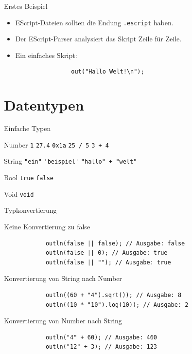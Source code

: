 \documentclass[ucs,9pt]{beamer}
\begin{document}
\begin{frame}[fragile]{Erstes Beispiel}
\begin{itemize}
	\addtolength{\itemsep}{\baselineskip}
	\item EScript-Dateien sollten die Endung \texttt{.escript} haben.
	\item Der EScript-Parser analysiert das Skript Zeile für Zeile.
	\item Ein einfaches Skript:
			\begin{lstlisting}
				out("Hallo Welt!\n");
			\end{lstlisting}
\end{itemize}
\end{frame}

\section{Datentypen}
\begin{frame}[fragile]{Einfache Typen}
	\begin{block}{Number}
		\hfill \lstinline!1! \hfill \lstinline!27.4! \hfill \lstinline!0x1a! \hfill \lstinline!25 / 5! \hfill \lstinline!3 + 4! \hfill{}
	\end{block}
	\begin{block}{String}
		\hfill \lstinline!"ein"! \hfill \lstinline!'beispiel'! \hfill \lstinline!"hallo" + "welt"! \hfill{}
	\end{block}
	\begin{block}{Bool}
		\hfill \lstinline!true! \hfill \lstinline!false! \hfill{}
	\end{block}
	\begin{block}{Void}
		\hfill \lstinline!void! \hfill{}
	\end{block}
\end{frame}

\begin{frame}[fragile]{Typkonvertierung}
	\begin{block}{Keine Konvertierung zu false}
		\begin{lstlisting}
			outln(false || false); // Ausgabe: false
			outln(false || 0); // Ausgabe: true
			outln(false || ""); // Ausgabe: true
		\end{lstlisting}
	\end{block}
	\pause
	\begin{block}{Konvertierung von String nach Number}
		\begin{lstlisting}
			outln((60 + "4").sqrt()); // Ausgabe: 8
			outln((10 * "10").log(10)); // Ausgabe: 2
		\end{lstlisting}
	\end{block}
	\pause
	\begin{block}{Konvertierung von Number nach String}
		\begin{lstlisting}
			outln("4" + 60); // Ausgabe: 460
			outln("12" + 3); // Ausgabe: 123
		\end{lstlisting}
	\end{block}
\end{frame}
\end{document}

